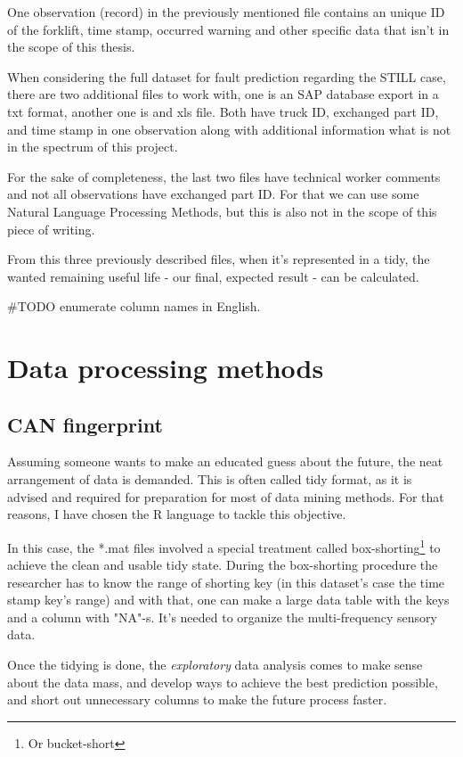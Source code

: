 One observation (record) in the previously mentioned file contains an unique ID of the forklift, time stamp, occurred warning and other specific data that isn't in the scope of this thesis.

When considering the full dataset for fault prediction regarding the STILL case, there are two additional files to work with, one is an SAP database export in a txt format, another one is and xls file. Both have truck ID, exchanged part ID, and time stamp in one observation along with additional information what is not in the spectrum of this project.

For the sake of completeness, the last two files have technical worker comments and not all observations have exchanged part ID. For that we can use some Natural Language Processing Methods, but this is also not in the scope of this piece of writing.

From this three previously described files, when it's represented in a tidy, the wanted remaining useful life  - our final, expected result - can be calculated.

\#TODO enumerate column names in English.
	\section{Data processing methods}
		\subsection{CAN fingerprint}
Assuming someone wants to make an educated guess about the future, the neat arrangement of data is demanded. This is often called tidy format, as it is advised and required for preparation for most of data mining methods. For that reasons, I have chosen the R language to tackle this objective.

In this case, the *.mat files involved a special treatment called box-shorting\footnote{Or bucket-short} \cite{Bucketshort} to achieve the clean and usable tidy state. During the box-shorting procedure the researcher has to know the range of shorting key (in this dataset's case the time stamp key's range) and with that, one can make a large data table with the keys and a column with "NA"-s. It's needed to organize the multi-frequency sensory data.

Once the tidying is done, the \textit{exploratory} data analysis comes to make sense about the data mass, and develop ways to achieve the best prediction possible, and short out unnecessary columns to make the future process faster.
